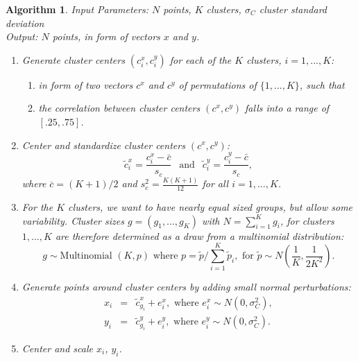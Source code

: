 \documentclass[12pt]{article}\usepackage[]{graphicx}\usepackage[]{color}
\newtheorem{algorithm}[theorem]{Algorithm}
\begin{document}
\begin{algorithm}\hfill\newline
  Input Parameters:  $N$ points, $K$ clusters, $\sigma_C$ cluster standard deviation \\
  Output: $N$ points, in form of vectors $x$ and $y$. 
  \begin{enumerate}
    \item Generate cluster centers $(c^x_{i}, c^y_{i})$ for each of the $K$ clusters, $i=1, ..., K$:
      \begin{enumerate}
        \item in form of two vectors $c^{x}$ and $c^y$ of permutations of $\{1, ..., K\}$, such that
        \item the correlation between cluster centers $(c^{x}, c^{y})$ falls into a range of $[.25, .75]$.
      \end{enumerate}
      \item Center and standardize cluster centers $(c^x, c^y)$:  
      \[
        \tilde{c}^x_{i} = \frac{c^x_{i} - \bar{c}}{s_c} \ \ \text{ and } \ \ \tilde{c}^y_{i} = \frac{c^y_{i} - \bar{c}}{s_c},
      \]
      where $\overline{c} = (K+1)/2$ and $s_c^2 = \frac{K(K+1)}{12}$ for all $i = 1, ..., K$.
    \item For the $K$ clusters, we want to have nearly equal sized groups, but allow some variability. Cluster sizes  $g = (g_1, ..., g_K)$ with $N = \sum_{i=1}^K g_i$, for clusters $1, ..., K$ are therefore determined as a draw from a multinomial distribution: 
    \[
    g \sim \text{Multinomial }(K, p) \text{ where } p = \tilde{p}/\sum_{i=1}^K \tilde{p}_i, \text{ for } \tilde{p} \sim N \left(\frac{1}{K}, \frac{1}{2 K^2} \right).
    \]
     
    \item Generate points around cluster centers by adding small normal perturbations: 
      \begin{eqnarray*}
        x_i &=& \tilde{c}^x_{g_i} + e^x_i, \text{ where } e^x_i \sim N(0, \sigma^2_C),\\
        y_i &=& \tilde{c}^y_{g_i} + e^y_i, \text{ where } e^y_i \sim N(0, \sigma^2_C).
      \end{eqnarray*}
    \item Center and scale $x_i$, $y_i$.
  \end{enumerate}
\end{algorithm} 
\end{document}
